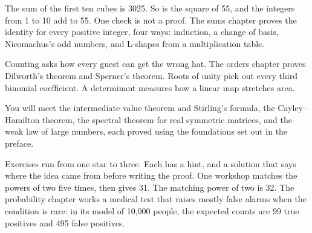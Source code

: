 The sum of the first ten cubes is 3025. So is the square of 55, and the integers from 1 to 10 add to 55. One check is not a proof. The sums chapter proves the identity for every positive integer, four ways: induction, a change of basis, Nicomachus's odd numbers, and L-shapes from a multiplication table.

Counting asks how every guest can get the wrong hat. The orders chapter proves Dilworth's theorem and Sperner's theorem. Roots of unity pick out every third binomial coefficient. A determinant measures how a linear map stretches area.

You will meet the intermediate value theorem and Stirling's formula, the Cayley--Hamilton theorem, the spectral theorem for real symmetric matrices, and the weak law of large numbers, each proved using the foundations set out in the preface.

Exercises run from one star to three. Each has a hint, and a solution that says where the idea came from before writing the proof. One workshop matches the powers of two five times, then gives 31. The matching power of two is 32. The probability chapter works a medical test that raises mostly false alarms when the condition is rare: in its model of 10,000 people, the expected counts are 99 true positives and 495 false positives.
